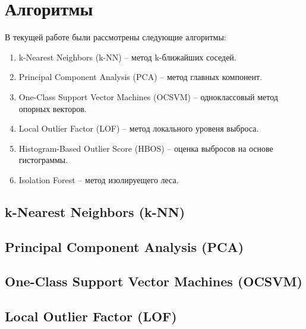 
\clearpage

\section{Алгоритмы} \label{sec:ch2/sec4}

\noindent В текущей работе были рассмотрены следующие алгоритмы:

\begin{enumerate}
	\item k-Nearest Neighbors (k-NN) \cite{knn} -- метод k-ближайших соседей.
	\item Principal Component Analysis (PCA) \cite{pca} -- метод главных компонент.
	\item One-Class Support Vector Machines (OCSVM) \cite{ocsvm} -- одноклассовый метод опорных векторов.
	\item Local Outlier Factor (LOF) \cite{lof} -- метод локального уровеня выброса.
	\item Histogram-Based Outlier Score (HBOS) \cite{hbos} -- оценка выбросов на основе гистограммы.
	\item Isolation Forest \cite{iforest} -- метод изолируещего леса.
\end{enumerate}

\subsection{k-Nearest Neighbors (k-NN)}

\todo{!}

\subsection{Principal Component Analysis (PCA)}

\todo{!}

\subsection{One-Class Support Vector Machines (OCSVM)}

\todo{!}

\subsection{Local Outlier Factor (LOF)}

